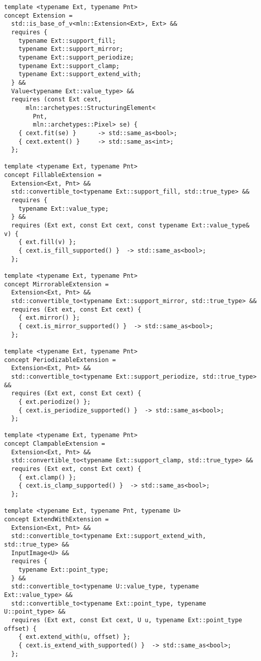 \begin{verbatim}
template <typename Ext, typename Pnt>
concept Extension =
  std::is_base_of_v<mln::Extension<Ext>, Ext> &&
  requires {
    typename Ext::support_fill;
    typename Ext::support_mirror;
    typename Ext::support_periodize;
    typename Ext::support_clamp;
    typename Ext::support_extend_with;
  } &&
  Value<typename Ext::value_type> &&
  requires (const Ext cext,
      mln::archetypes::StructuringElement<
        Pnt,
        mln::archetypes::Pixel> se) {
    { cext.fit(se) }      -> std::same_as<bool>;
    { cext.extent() }     -> std::same_as<int>;
  };

template <typename Ext, typename Pnt>
concept FillableExtension =
  Extension<Ext, Pnt> &&
  std::convertible_to<typename Ext::support_fill, std::true_type> &&
  requires {
    typename Ext::value_type;
  } &&
  requires (Ext ext, const Ext cext, const typename Ext::value_type& v) {
    { ext.fill(v) };
    { cext.is_fill_supported() }  -> std::same_as<bool>;
  };

template <typename Ext, typename Pnt>
concept MirrorableExtension =
  Extension<Ext, Pnt> &&
  std::convertible_to<typename Ext::support_mirror, std::true_type> &&
  requires (Ext ext, const Ext cext) {
    { ext.mirror() };
    { cext.is_mirror_supported() }  -> std::same_as<bool>;
  };

template <typename Ext, typename Pnt>
concept PeriodizableExtension =
  Extension<Ext, Pnt> &&
  std::convertible_to<typename Ext::support_periodize, std::true_type> &&
  requires (Ext ext, const Ext cext) {
    { ext.periodize() };
    { cext.is_periodize_supported() }  -> std::same_as<bool>;
  };

template <typename Ext, typename Pnt>
concept ClampableExtension =
  Extension<Ext, Pnt> &&
  std::convertible_to<typename Ext::support_clamp, std::true_type> &&
  requires (Ext ext, const Ext cext) {
    { ext.clamp() };
    { cext.is_clamp_supported() }  -> std::same_as<bool>;
  };

template <typename Ext, typename Pnt, typename U>
concept ExtendWithExtension =
  Extension<Ext, Pnt> &&
  std::convertible_to<typename Ext::support_extend_with, std::true_type> &&
  InputImage<U> &&
  requires {
    typename Ext::point_type;
  } &&
  std::convertible_to<typename U::value_type, typename Ext::value_type> &&
  std::convertible_to<typename Ext::point_type, typename U::point_type> &&
  requires (Ext ext, const Ext cext, U u, typename Ext::point_type offset) {
    { ext.extend_with(u, offset) };
    { cext.is_extend_with_supported() }  -> std::same_as<bool>;
  };
\end{verbatim}

